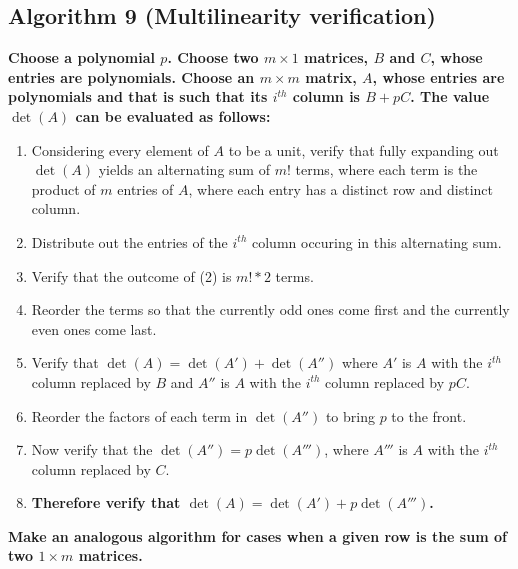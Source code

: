 \documentclass[twocolumn]{article}
\begin{document}
		\subsection{Algorithm 9 (Multilinearity verification)}\label{sec:algorithm 9}
			\textbf{Choose a polynomial $p$. Choose two $m\times 1$ matrices, $B$ and $C$, whose entries are polynomials. Choose an $m\times m$ matrix, $A$, whose entries are polynomials and that is such that its $i^{th}$ column is $B+pC$. The value $\det(A)$ can be evaluated as follows:}
			\begin{enumerate}
				\item Considering every element of $A$ to be a unit, verify that fully expanding out $\det(A)$ yields an alternating sum of $m!$ terms, where each term is the product of $m$ entries of $A$, where each entry has a distinct row and distinct column.
				\item Distribute out the entries of the $i^{th}$ column occuring in this alternating sum.
				\item Verify that the outcome of (2) is $m!*2$ terms.
				\item Reorder the terms so that the currently odd ones come first and the currently even ones come last.
				\item Verify that $\det(A)=\det(A') + \det(A'')$ where $A'$ is $A$ with the $i^{th}$ column replaced by $B$ and $A''$ is $A$ with the $i^{th}$ column replaced by $pC$.
				\item Reorder the factors of each term in $\det(A'')$ to bring $p$ to the front.
				\item Now verify that the $\det(A'')=p\det(A''')$, where $A'''$ is $A$ with the $i^{th}$ column replaced by $C$.
				\item \textbf{Therefore verify that $\det(A)=\det(A') + p\det(A''')$.}
			\end{enumerate}
			\textbf{Make an analogous algorithm for cases when a given row is the sum of two $1\times m$ matrices.}
\end{document}
